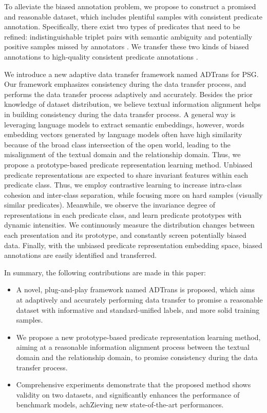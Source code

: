 \documentclass[letterpaper]{article} %
\begin{document}
To alleviate the biased annotation problem, we propose to construct a promised and reasonable dataset, which includes plentiful samples with consistent predicate annotation. Specifically, there exist two types of predicates that need to be refined: indistinguishable triplet pairs with semantic ambiguity and potentially positive samples missed by annotators \cite{zhang2022fine}. We transfer these two kinds of biased annotations to high-quality consistent predicate annotations \cite{zhang2023revisiting,lv2022personalizing}.

We introduce a new adaptive data transfer framework named ADTrans for PSG. Our framework emphasizes consistency during the data transfer process, and performs the data transfer process adaptively and accurately. Besides the prior knowledge of dataset distribution, we believe textual information alignment helps in building consistency during the data transfer process. A general way is leveraging language models to extract semantic embeddings, however, words embedding vectors generated by language models often have high similarity because of the broad class intersection of the open world, leading to the misalignment of the textual domain and the relationship domain. Thus, we propose a prototype-based predicate representation learning method. Unbiased predicate representations are expected to share invariant features within each predicate class. Thus, we employ contrastive learning to increase intra-class cohesion and inter-class separation, while focusing more on hard samples (visually similar predicates). Meanwhile, we observe the invariance degree of representations in each predicate class, and learn predicate prototypes with dynamic intensities. We continuously measure the distribution changes between each presentation and its prototype, and constantly screen potentially biased data. Finally, with the unbiased predicate representation embedding space, biased annotations are easily identified and transferred.




In summary, the following contributions are made in this paper:
\begin{itemize}
    \item A novel, plug-and-play framework named ADTrans is proposed, which aims at adaptively and accurately performing data transfer to promise a reasonable dataset with informative and standard-unified labels, and more solid training samples.
    \item We propose a new prototype-based predicate representation learning method, aiming at a reasonable information alignment process between the textual domain and the relationship domain, to promise consistency during the data transfer process.
    \item Comprehensive experiments demonstrate that the proposed method shows validity on two datasets, and significantly enhances the performance of benchmark models, achZieving new state-of-the-art performances.
\end{itemize}
\end{document}
